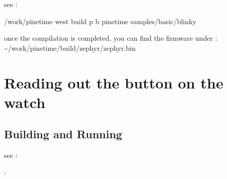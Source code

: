 \documentclass[letterpaper,10pt,english]{sphinxmanual}
\begin{document}
see : {\hyperref[\detokenize{samples/basic/blinky/README:blinky-sample}]{}}

\begin{sphinxVerbatim}[commandchars=\\\{\}]
  \PYGZti{}/work/pinetime
 west build \PYGZhy{}p \PYGZhy{}b pinetime samples/basic/blinky
\end{sphinxVerbatim}

once the compilation is completed,  you can find the firmware under :
\textasciitilde{}/work/pinetime/build/zephyr/zephyr.bin


\section{Reading out the button on the watch}
\label{\detokenize{basicapplications:reading-out-the-button-on-the-watch}}
\begin{sphinxVerbatim}[commandchars=\\\{\}]
        

              
        
\end{sphinxVerbatim}


\subsection{Building and Running}
\label{\detokenize{basicapplications:building-and-running}}
see : {\hyperref[\detokenize{samples/basic/button/README:button-sample}]{}}

:

\begin{sphinxVerbatim}[commandchars=\\\{\}]
\end{sphinxVerbatim}
\end{document}
